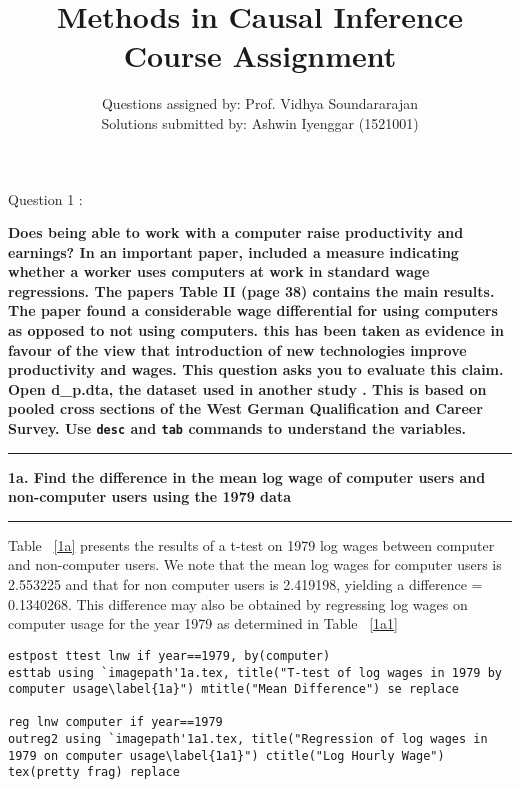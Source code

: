 \documentclass[12pt]{article}
\newcommand\question[1]{\vspace{1em}\hrule\vspace{1em}\textbf{#1}\vspace{1em}\hrule\vspace{1em}}
\begin{document}
\title{Methods in Causal Inference Course Assignment}
\author{Questions assigned by: Prof. Vidhya Soundararajan\\ Solutions submitted by: Ashwin Iyenggar  (1521001)} 


\maketitle
\thispagestyle{empty}

\setlength\parindent{0pt}

\begin{center}\LARGE{Question 1 : \cite{Dinardo1997}}\end{center}
\textbf{Does being able to work with a computer raise productivity and earnings? In an important paper, \cite{Krueger1993} included a measure indicating whether a worker uses computers at work in standard wage regressions. The paper\textquotesingle s Table II (page 38) contains the main results. The paper found a considerable wage differential for using computers as opposed to not using computers. this has been taken as evidence in favour of the view that introduction of new technologies improve productivity and wages. This question asks you to evaluate this claim. Open d\_p.dta, the dataset used in another study \citep{Dinardo1997}. This is based on pooled cross sections of the West German Qualification and Career Survey. Use \texttt{desc} and \texttt{tab} commands to understand the variables.}
\question{1a. Find the difference in the mean log wage of computer users and non-computer users using the 1979 data}

Table ~\ref{1a} presents the results of a t-test on 1979 log wages between computer and non-computer users. We note that the mean log wages for computer users is 2.553225 and that for non computer users is 2.419198, yielding a difference = 0.1340268. This difference may also be obtained by regressing log wages on computer usage for the year 1979 as determined in Table ~\ref{1a1}

\begin{lstlisting}
estpost ttest lnw if year==1979, by(computer)
esttab using `imagepath'1a.tex, title("T-test of log wages in 1979 by computer usage\label{1a}") mtitle("Mean Difference") se replace

reg lnw computer if year==1979
outreg2 using `imagepath'1a1.tex, title("Regression of log wages in 1979 on computer usage\label{1a1}") ctitle("Log Hourly Wage") tex(pretty frag) replace
\end{lstlisting}
\end{document}
